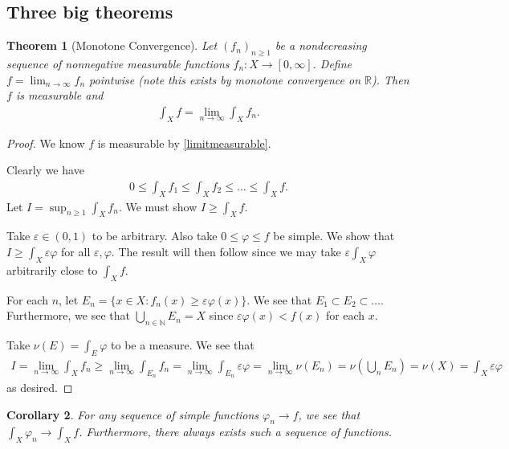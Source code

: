 \documentclass[11pt]{amsart}
\newtheorem{theorem}{Theorem}[section]
\newtheorem{corollary}[theorem]{Corollary}
\theoremstyle{definition}
\numberwithin{equation}{section}
\begin{document}
\subsection{Three big theorems}
\begin{theorem}[Monotone Convergence]\label{monotoneconvergence} Let $(f_n)_{n\ge1}$ be a nondecreasing sequence of nonnegative measurable functions $f_n:X\to[0,\infty]$. Define $f=\lim_{n\to\infty}f_n$ pointwise (note this exists by monotone convergence on $\mathbb R$). Then $f$ is measurable and 
\begin{align*}
    \int_Xf=\lim_{n\to\infty}\int_Xf_n.
\end{align*}
\end{theorem}
\begin{proof}
    We know $f$ is measurable by \ref{limitmeasurable}.

    Clearly we have
    \begin{align*}
        0\le\int_Xf_1\le\int_Xf_2\le\ldots\le\int_Xf.
    \end{align*}
    Let $I=\sup_{n\ge1}\int_Xf_n$. We must show $I\ge\int_Xf$.

    Take $\varepsilon\in(0,1)$ to be arbitrary. Also take $0\le\varphi\le f$ be simple. We show that $I\ge\int_X\varepsilon\varphi$ for all $\varepsilon,\varphi$. The result will then follow since we may take $\varepsilon\int_X\varphi$ arbitrarily close to $\int_Xf$.

    For each $n$, let $E_n=\{x\in X:f_n(x)\ge\varepsilon\varphi(x)\}$. We see that $E_1\subset E_2\subset\ldots$. Furthermore, we see that $\bigcup_{n\in\mathbb N}E_n=X$ since $\varepsilon\varphi(x)<f(x)$ for each $x$. 

    Take $\nu(E)=\int_E\varphi$ to be a measure. We see that 
    \begin{align*}
        I=\lim_{n\to\infty}\int_Xf_n\ge\lim_{n\to\infty}\int_{E_n}f_n=\lim_{n\to\infty}\int_{E_n}\varepsilon\varphi=\lim_{n\to\infty}\nu(E_n)=\nu(\bigcup_nE_n)=\nu(X)=\int_X\varepsilon\varphi
    \end{align*}
    as desired.
\end{proof}
\begin{corollary}
    For any sequence of simple functions $\varphi_n\to f$, we see that $\int_X\varphi_n\to\int_Xf$. Furthermore, there always exists such a sequence of functions.
\end{corollary}
\end{document}
